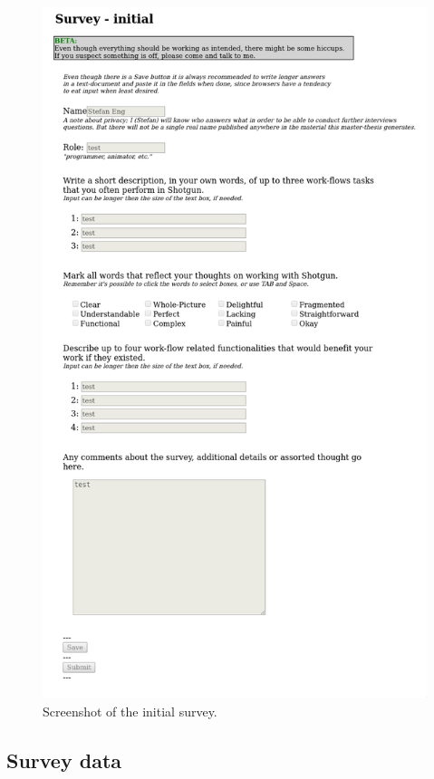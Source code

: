     \newpage
    \begin{figure}[H]
      \includegraphics[width=\textwidth,trim={0cm 1cm 0cm 31cm},clip]{images/000_survey_initial.png}
      \caption{Screenshot of the initial survey.}
      \label{fig:ref_fig_survey_initial}
    \end{figure}

  \subsection{Survey data}
